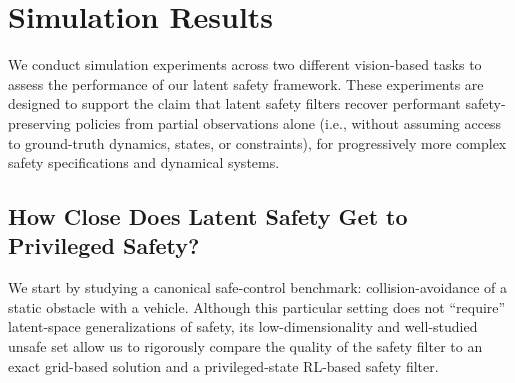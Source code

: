 \section{Simulation Results}
\label{sec:sim}

We conduct simulation experiments across two different vision-based tasks to assess the performance of our latent safety framework. 
These experiments are designed to support the claim that latent safety filters recover performant safety-preserving policies from partial observations alone (i.e., without assuming access to ground-truth dynamics, states, or constraints), for progressively more complex safety specifications and dynamical systems. 


\subsection{How Close Does Latent Safety Get to Privileged Safety?}
We start by studying a canonical safe-control benchmark: collision-avoidance of a static obstacle with a vehicle.
Although this particular setting does not ``require'' latent-space generalizations of safety, its low-dimensionality and well-studied unsafe set allow us to 
rigorously compare the quality of the safety filter to an exact grid-based solution and 
a privileged-state RL-based safety filter.



